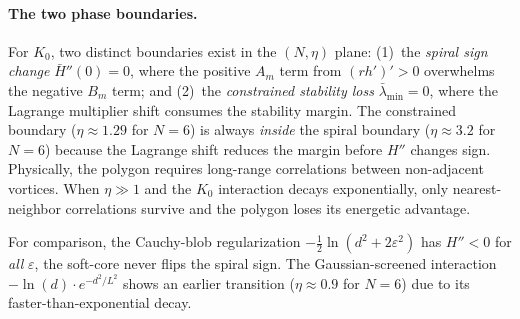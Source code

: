 \paragraph{The two phase boundaries.}
For $K_0$, two distinct boundaries exist in the $(N, \eta)$ plane:
(1)~the \emph{spiral sign change} $\bar H''(0) = 0$, where the
positive $A_m$ term from $(rh')' > 0$ overwhelms the negative $B_m$
term; and (2)~the \emph{constrained stability loss}
$\bar\lambda_{\min} = 0$, where the Lagrange multiplier shift
consumes the stability margin.  The constrained boundary
($\eta \approx 1.29$ for $N = 6$) is always \emph{inside} the
spiral boundary ($\eta \approx 3.2$ for $N = 6$) because the
Lagrange shift reduces the margin before $H''$ changes sign.
Physically, the polygon requires long-range correlations between
non-adjacent vortices.  When $\eta \gg 1$ and the $K_0$ interaction
decays exponentially, only nearest-neighbor correlations survive and
the polygon loses its energetic advantage.

For comparison, the Cauchy-blob regularization
$-\tfrac12\ln(d^2 + 2\varepsilon^2)$ has $H'' < 0$ for \emph{all}
$\varepsilon$, the soft-core never flips the spiral sign.  The
Gaussian-screened interaction $-\ln(d)\cdot e^{-d^2/L^2}$
shows an earlier transition ($\eta \approx 0.9$ for $N = 6$) due to
its faster-than-exponential decay.

